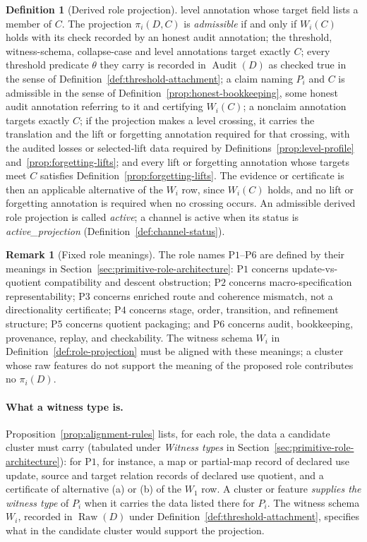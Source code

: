 \documentclass[11pt]{article}
\theoremstyle{definition}
\newtheorem{definition}[theorem]{Definition}
\newtheorem{remark}[theorem]{Remark}
\newcommand{\Raw}[1]{\ensuremath{\operatorname{Raw}\!\left(#1\right)}}
\newcommand{\Audit}[1]{\ensuremath{\operatorname{Audit}\!\left(#1\right)}}
\newcommand{\activeproj}{\textit{active\_\allowbreak projection}}
\newcommand{\Pone}{\ensuremath{\mathrm{P1}}}
\newcommand{\Ptwo}{\ensuremath{\mathrm{P2}}}
\newcommand{\Pthree}{\ensuremath{\mathrm{P3}}}
\newcommand{\Pfour}{\ensuremath{\mathrm{P4}}}
\newcommand{\Pfive}{\ensuremath{\mathrm{P5}}}
\newcommand{\Psix}{\ensuremath{\mathrm{P6}}}
\begin{document}
\begin{definition}[Derived role projection]
level annotation whose target field lists a member of \(C\). The projection \(\pi_i(D,C)\) is \emph{admissible} if and only if
\(W_i(C)\) holds with its check recorded by an honest audit annotation; the
threshold, witness-schema, collapse-case and level annotations target exactly
\(C\); every threshold predicate \(\theta\) they carry is recorded in \(\Audit{D}\) as
checked true in the sense of Definition~\ref{def:threshold-attachment}; a claim naming \(P_i\) and \(C\) is admissible in the sense of
Definition~\ref{prop:honest-bookkeeping}, some honest audit annotation
referring to it and certifying \(W_i(C)\); a nonclaim annotation targets exactly \(C\); if the
projection makes a level crossing, it carries the translation and the lift or
forgetting annotation required for that crossing, with the audited losses or
selected-lift data required by Definitions~\ref{prop:level-profile}
and~\ref{prop:forgetting-lifts}; and every lift or forgetting annotation whose
targets meet \(C\) satisfies Definition~\ref{prop:forgetting-lifts}. The
evidence or certificate is then an applicable alternative of the \(W_i\) row,
since \(W_i(C)\) holds, and no lift or forgetting annotation is required when
no crossing occurs. An admissible derived role projection is called
\emph{active}; a channel is active when its status is \activeproj{}
(Definition~\ref{def:channel-status}).
\end{definition}

\begin{remark}[Fixed role meanings]\label{rem:fixed-role-meanings}
The role names \Pone{}--\Psix{} are defined by their meanings in
Section~\ref{sec:primitive-role-architecture}: \Pone{} concerns
update-vs-quotient compatibility and descent obstruction; \Ptwo{} concerns
macro-specification representability; \Pthree{} concerns enriched
route and coherence mismatch, not a directionality certificate; \Pfour{}
concerns stage, order, transition, and refinement structure; \Pfive{}
concerns quotient packaging; and
\Psix{} concerns audit, bookkeeping, provenance, replay, and checkability.
The witness schema \(W_i\) in Definition~\ref{def:role-projection} must be
aligned with these meanings; a cluster whose raw features do not support the
meaning of the proposed role contributes no \(\pi_i(D)\).
\end{remark}

\paragraph{What a witness type is.} Proposition~\ref{prop:alignment-rules}
lists, for each role, the data a candidate cluster must carry (tabulated
under \emph{Witness types} in Section~\ref{sec:primitive-role-architecture}): for \Pone{},
for instance, a map or partial-map record of declared use update, source and target relation records of declared use quotient, and a certificate of alternative (a) or (b) of the \(W_1\) row.
A cluster or feature \emph{supplies the witness type} of \(P_i\) when it
carries the data listed there for \(P_i\). The witness schema \(W_i\), recorded in
\(\Raw{D}\) under Definition~\ref{def:threshold-attachment}, specifies what in
the candidate cluster would support the projection.
\end{document}
